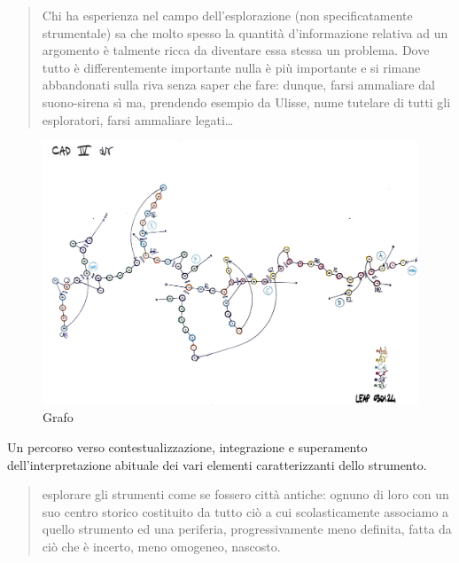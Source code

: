 \documentclass{gs-adonis}
\begin{document}
\begin{quote}
  Chi  ha  esperienza  nel  campo  dell’esplorazione  (non  specificatamente
  strumentale) sa che molto spesso la quantità d’informazione relativa ad un
  argomento  è  talmente  ricca  da  diventare  essa  stessa  un  problema.
  Dove tutto  è differentemente  importante  nulla  è  più  importante  e  si
  rimane abbandonati sulla riva senza saper che fare: dunque, farsi ammaliare dal
  suono-sirena sì ma, prendendo esempio da Ulisse, nume tutelare di tutti gli
  esploratori, farsi ammaliare legati\ldots
\end{quote}

\begin{figure}[t]
  \centering
  \includegraphics[width=\linewidth]{images/CAD-IV-GRAFO-ANNOTATO.pdf}
  \captionsetup{width=.81\linewidth}
  \caption{Grafo}
  \label{grafo}
\end{figure}

Un percorso verso contestualizzazione, integrazione e superamento
dell’interpretazione abituale dei vari elementi caratterizzanti dello strumento.

\begin{quote}
  esplorare gli strumenti come se fossero città antiche: ognuno di loro con un
  suo centro storico costituito da tutto ciò a cui scolasticamente associamo a
  quello strumento ed una periferia, progressivamente meno definita, fatta da
  ciò che è incerto, meno omogeneo, nascosto.
\end{quote}
\end{document}
